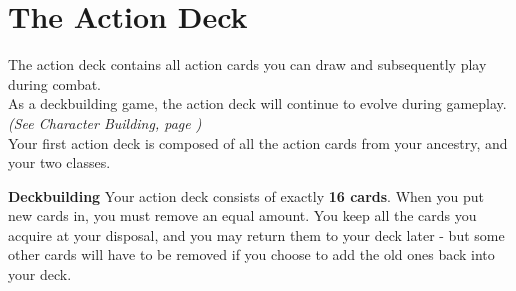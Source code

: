 
\section{The Action Deck}
The action deck contains all action cards you can draw and subsequently play during combat.\\
As a deckbuilding game, the action deck will continue to evolve during gameplay. \textit{(See Character Building, page \pageref{Section_CharacterBuilding})}\\
Your first action deck is composed of all the action cards from your ancestry, and your two classes. 

\textbf{Deckbuilding} Your action deck consists of exactly \textbf{16 cards}. When you put new cards in, you must remove an equal amount. You keep all the cards you acquire at your disposal, and you may return them to your deck later - but some other cards will have to be removed if you choose to add the old ones back into your deck.

